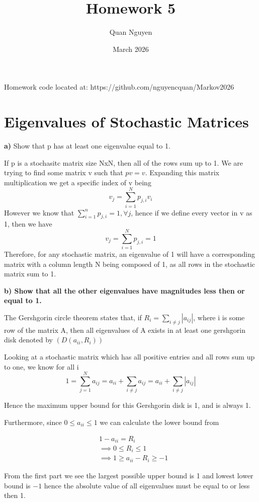 \documentclass{article}
\title{Homework 5}
\author{Quan Nguyen}
\date{March 2026}
\begin{document}
\maketitle

Homework code located at: https://github.com/nguyencquan/Markov2026

\section{Eigenvalues of Stochastic Matrices}

\textbf{a)} Show that p has at least one eigenvalue equal to 1.

If p is a stochasitc matrix size NxN, then all of the rows sum up to 1. We are trying to find some matrix
v such that $pv = v$. Expanding this matrix multiplication we get a specific index of v being
$$
v_{j} = \sum_{i=1}^{N}p_{j,i}v_{i}
$$
However we know that $\sum_{i=1}^n p_{j,i}=1,\forall j$, hence if we define every vector in v as 1, then we have
$$
v_{j} = \sum_{i=1}^{N}p_{j,i} = 1
$$
Therefore, for any stochastic matrix, an eigenvalue of 1 will have a corresponding matrix with
a column length N being composed of 1, as all rows in the stochastic matrix sum to 1.

\textbf{b) Show that all the other eigenvalues have magnitudes less then or equal to 1.}

The Gershgorin circle theorem states that, if $R_i = \sum_{i\neq j}|a_{ij}|$, where i is some row
of the matrix A, then all eigenvalues of A exists in at least one gershgorin disk denoted by
$(D(a_{ii},R_i))$

Looking at a stochastic matrix which has all positive entries and all rows sum up to one, we know for all i
$$1 = \sum_{j=1}^Na_{ij} = a_{ii} + \sum_{i\neq j}a_{ij} = a_{ii}+\sum_{i\neq j}|a_{ij}|$$

Hence the maximum upper bound for this Gershgorin disk is 1, and is always 1.

Furthermore, since $0\leq a_{ii} \leq 1$ we can calculate the lower bound from

\begin{align*}
    &1-a_{ii} = R_i\\
    &\implies 0\leq R_i \leq 1\\
    &\implies 1 \geq a_{ii} - R_i \geq -1
\end{align*}

From the first part we see the largest possible upper bound is 1 and lowest lower bound is $-1$
hence the absolute value of all eigenvalues must be equal to or less then 1.
\end{document}
